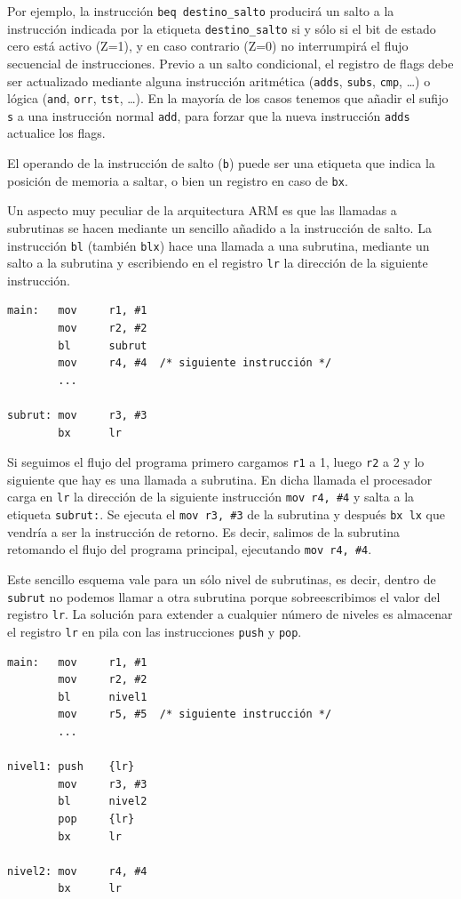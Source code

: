 Por ejemplo, la instrucción {\tt beq destino\_salto} producirá un salto
a la instrucción indicada por la etiqueta {\tt destino\_salto} si y sólo
si el bit de estado cero está activo (Z=1), y en caso contrario
(Z=0) no interrumpirá el flujo secuencial de instrucciones.
Previo a un salto condicional, el registro de flags debe ser actualizado
mediante alguna instrucción aritmética ({\tt adds}, {\tt subs}, {\tt cmp},
\dots) o lógica ({\tt and}, {\tt orr}, {\tt tst}, \dots). En la mayoría
de los casos tenemos que añadir el sufijo {\tt s} a una instrucción normal
{\tt add}, para forzar que la nueva instrucción {\tt adds} actualice los flags.

El operando de la instrucción de salto ({\tt b}) puede ser una etiqueta que indica la
posición de memoria a saltar, o bien un registro en caso de {\tt bx}.

Un aspecto muy peculiar de la arquitectura ARM es que las llamadas a
subrutinas se hacen mediante un sencillo añadido a la instrucción de salto. La
instrucción {\tt bl} (también {\tt blx}) hace una llamada a una subrutina,
mediante un salto a la subrutina y escribiendo en el registro {\tt lr} la
dirección de la siguiente instrucción.

\begin{lstlisting}
main:   mov     r1, #1
        mov     r2, #2
        bl      subrut
        mov     r4, #4  /* siguiente instrucción */
        ...

subrut: mov     r3, #3
        bx      lr
\end{lstlisting}

Si seguimos el flujo del programa primero cargamos {\tt r1} a 1, luego {\tt r2}
a 2 y lo siguiente que hay es una llamada a subrutina. En dicha llamada el
procesador carga en {\tt lr} la dirección de la siguiente instrucción {\tt mov r4, \#4}
y salta a la etiqueta {\tt subrut:}. Se ejecuta el {\tt mov r3, \#3} de la subrutina
y después {\tt bx lx} que vendría a ser la instrucción de retorno. Es decir, salimos
de la subrutina retomando el flujo del programa principal, ejecutando {\tt mov r4, \#4}.

Este sencillo esquema vale para un sólo nivel de subrutinas, es decir, dentro de
{\tt subrut} no podemos llamar a otra subrutina porque sobreescribimos el valor del
registro {\tt lr}. La solución para extender a cualquier número de niveles es almacenar
el registro {\tt lr} en pila con las instrucciones {\tt push} y {\tt pop}.

\begin{lstlisting}
main:   mov     r1, #1
        mov     r2, #2
        bl      nivel1
        mov     r5, #5  /* siguiente instrucción */
        ...

nivel1: push    {lr}
        mov     r3, #3
        bl      nivel2
        pop     {lr}
        bx      lr

nivel2: mov     r4, #4
        bx      lr
\end{lstlisting}

